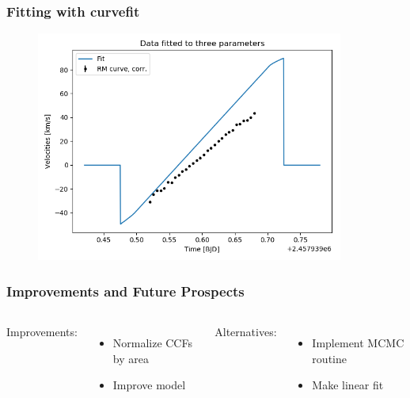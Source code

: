\documentclass[show notes]{beamer}
\begin{document}
\begin{frame}
\frametitle{Fitting with curvefit}
\begin{figure}
\centering
\includegraphics[width=0.9\textwidth]{../figures/curve_fit_rmcurve.png}
\end{figure}
\end{frame}

\begin{frame}
\frametitle{Improvements and Future Prospects}
\begin{columns}
	Improvements:
	\begin{itemize}
	\item Normalize CCFs by area
	\item Improve model
	\end{itemize}
	
	Alternatives:
	\begin{itemize}
	\item Implement MCMC routine
	\item Make linear fit
	\end{itemize}
\end{columns}
\end{frame}
\end{document}
